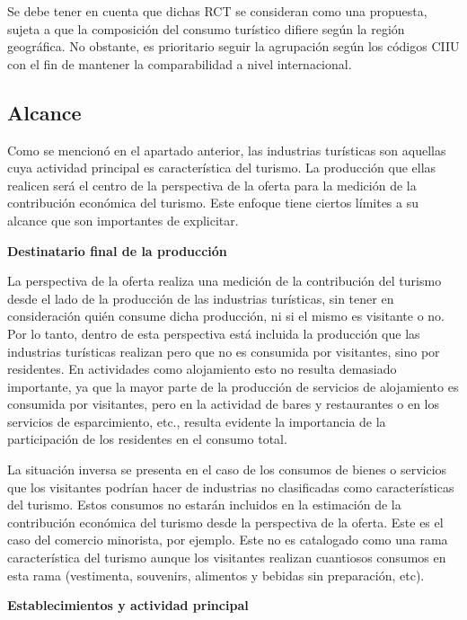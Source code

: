 \documentclass[
  openany]{book}
\begin{document}
Se debe tener en cuenta que dichas RCT se consideran como una propuesta, sujeta a que la composición del consumo turístico difiere según la región geográfica. No obstante, es prioritario seguir la agrupación según los códigos CIIU con el fin de mantener la comparabilidad a nivel internacional.

\hypertarget{alcance}{%
\subsection{Alcance}\label{alcance}}

Como se mencionó en el apartado anterior, las industrias turísticas son aquellas cuya actividad principal es característica del turismo. La producción que ellas realicen será el centro de la perspectiva de la oferta para la medición de la contribución económica del turismo. Este enfoque tiene ciertos límites a su alcance que son importantes de explicitar.

\textbf{Destinatario final de la producción}

La perspectiva de la oferta realiza una medición de la contribución del turismo desde el lado de la producción de las industrias turísticas, sin tener en consideración quién consume dicha producción, ni si el mismo es visitante o no. Por lo tanto, dentro de esta perspectiva está incluida la producción que las industrias turísticas realizan pero que no es consumida por visitantes, sino por residentes. En actividades como alojamiento esto no resulta demasiado importante, ya que la mayor parte de la producción de servicios de alojamiento es consumida por visitantes, pero en la actividad de bares y restaurantes o en los servicios de esparcimiento, etc., resulta evidente la importancia de la participación de los residentes en el consumo total.

La situación inversa se presenta en el caso de los consumos de bienes o servicios que los visitantes podrían hacer de industrias no clasificadas como características del turismo. Estos consumos no estarán incluidos en la estimación de la contribución económica del turismo desde la perspectiva de la oferta. Este es el caso del comercio minorista, por ejemplo. Este no es catalogado como una rama característica del turismo aunque los visitantes realizan cuantiosos consumos en esta rama (vestimenta, souvenirs, alimentos y bebidas sin preparación, etc).

\textbf{Establecimientos y actividad principal}
\end{document}

